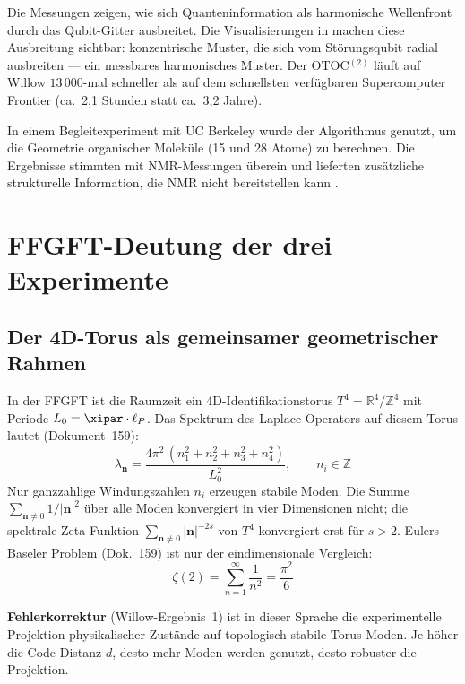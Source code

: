 \begin{keypoint}
Die Messungen zeigen, wie sich Quanteninformation als harmonische Wellenfront durch
das Qubit-Gitter ausbreitet. Die Visualisierungen in \cite{GoogleEchoes2025} machen
diese Ausbreitung sichtbar: konzentrische Muster, die sich vom Störungsqubit radial
ausbreiten — ein messbares harmonisches Muster.
Der OTOC$^{(2)}$ läuft auf Willow $13\,000$-mal schneller als auf dem schnellsten
verfügbaren Supercomputer Frontier (ca.\ 2,1 Stunden statt ca.\ 3,2 Jahre).
\end{keypoint}

In einem Begleitexperiment mit UC Berkeley wurde der Algorithmus genutzt, um die
Geometrie organischer Moleküle (15 und 28 Atome) zu berechnen. Die Ergebnisse
stimmten mit NMR-Messungen überein und lieferten zusätzliche strukturelle Information,
die NMR nicht bereitstellen kann \cite{GoogleEchoes2025}.


\section{FFGFT-Deutung der drei Experimente}

\subsection{Der 4D-Torus als gemeinsamer geometrischer Rahmen}

In der FFGFT ist die Raumzeit ein 4D-Identifikationstorus
$T^4 = \mathbb{R}^4/\mathbb{Z}^4$ mit Periode $L_0 = \xipar \cdot \ell_P$.
Das Spektrum des Laplace-Operators auf diesem Torus lautet (Dokument~159):
\begin{equation}
    \lambda_{\mathbf{n}} = \frac{4\pi^2\,(n_1^2 + n_2^2 + n_3^2 + n_4^2)}{L_0^2},
    \qquad n_i \in \mathbb{Z}
\end{equation}
Nur ganzzahlige Windungszahlen $n_i$ erzeugen stabile Moden. Die Summe
$\sum_{\mathbf{n}\neq 0} 1/|\mathbf{n}|^2$ über alle Moden konvergiert in vier
Dimensionen nicht; die spektrale Zeta-Funktion $\sum_{\mathbf{n}\neq0}|\mathbf{n}|^{-2s}$
von $T^4$ konvergiert erst für $s > 2$. Eulers Baseler Problem (Dok.~159) ist nur
der eindimensionale Vergleich:
\begin{equation}
    \zeta(2) = \sum_{n=1}^{\infty} \frac{1}{n^2} = \frac{\pi^2}{6}
\end{equation}

\textbf{Fehlerkorrektur} (Willow-Ergebnis~1) ist in dieser Sprache die
experimentelle Projektion physikalischer Zustände auf topologisch stabile Torus-Moden.
Je höher die Code-Distanz $d$, desto mehr Moden werden genutzt, desto robuster die
Projektion.

